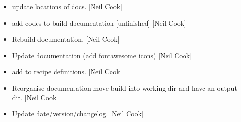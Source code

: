 \documentclass[a4paper,10pt,english]{report}
\begin{document}
\begin{itemize}
\item {} 
 \sphinxhyphen{} update locations of docs. {[}Neil
Cook{]}

\item {} 
 \sphinxhyphen{} add codes to build
documentation {[}unfinished{]} {[}Neil Cook{]}

\item {} 
Re\sphinxhyphen{}build documentation. {[}Neil Cook{]}

\item {} 
Update documentation (add fontawesome icons) {[}Neil Cook{]}

\item {} 
 \sphinxhyphen{} add 
 to recipe definitions. {[}Neil Cook{]}

\item {} 
Reorganise documentation \sphinxhyphen{} move build into working dir and have an
output dir. {[}Neil Cook{]}

\item {} 
Update date/version/changelog. {[}Neil Cook{]}

\end{itemize}
\end{document}
